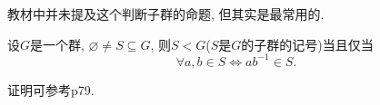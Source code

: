 \begin{remark}
    教材中并未提及这个判断子群的命题, 但其实是最常用的.

    \begin{propstar}[子群的判定]
        设$G$是一个群, $\varnothing \neq S \subseteq G$, 则$S < G$($S$是$G$的子群的记号)当且仅当
        \[
            \forall a, b \in S \iff ab^{-1} \in S.
        \]
    \end{propstar}
    证明可参考\cite{aluffi2009algebra}p79.
\end{remark}